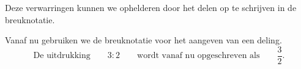 \documentclass{tstextbook}
\begin{document}
Deze verwarringen kunnen we ophelderen door het delen op te schrijven in de breuknotatie.

\begin{remark}
    Vanaf nu gebruiken we de breuknotatie voor het aangeven van een deling. 
%     
    \[
     \text{De uitdrukking} \qquad  3 : 2 \qquad \text{wordt vanaf nu opgeschreven als} \qquad \frac{3}{2}.
    \]
\end{remark}
\end{document}
